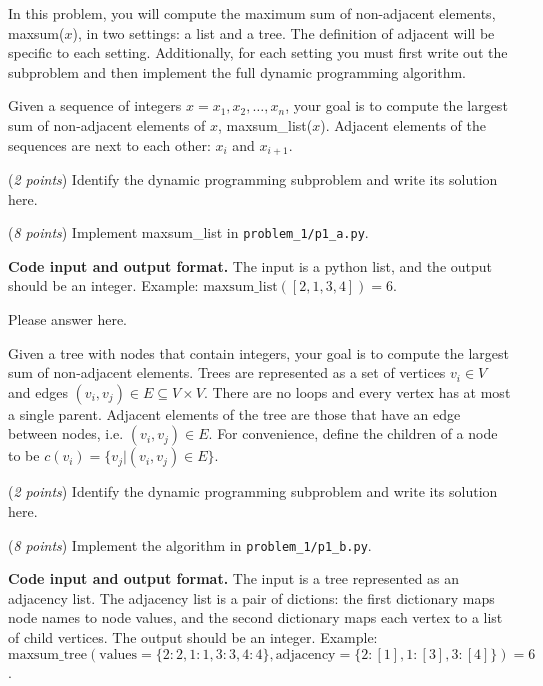 \documentclass{hw}
\newcommand{\io}{\textbf{Code input and output format.} }
\begin{document}

\begin{problem}
In this problem, you will compute the maximum sum of non-adjacent elements,
maxsum($x$), in two settings:
a list and a tree.
The definition of adjacent will be specific to each setting.
Additionally, for each setting you must first write out the subproblem
and then implement the full dynamic programming algorithm.

\begin{subproblem}
Given a sequence of integers $ x = x_1,x_2,\ldots,x_n $,
your goal is to compute the largest sum of non-adjacent elements of $x$,
maxsum\_list($x$).
Adjacent elements of the sequences are next to each other: $x_i$ and $x_{i+1}$.

(\textit{2 points}) Identify the dynamic programming subproblem and write its solution here.

(\textit{8 points}) Implement maxsum\_list in \texttt{problem\_1/p1\_a.py}.
\end{subproblem}

\io The input is a python list, and the output should be an integer.
Example: $\text{maxsum\_list}([2,1,3,4]) = 6$.

\begin{solution}
Please answer here.
\end{solution}

\begin{subproblem}
Given a tree with nodes that contain integers,
your goal is to compute the largest sum of non-adjacent elements.
Trees are represented as a set of vertices
$v_i \in V$ and edges $(v_i, v_j) \in E \subseteq V\times V$.
There are no loops and every vertex has at most a single parent.
Adjacent elements of the tree are those that have an edge between nodes, i.e. $(v_i,v_j)\in E$.
For convenience, define the children of a node to be $c(v_i) = \{v_j | (v_i,v_j)\in E\}$.

(\textit{2 points}) Identify the dynamic programming subproblem and write its solution here.

(\textit{8 points}) Implement the algorithm in \texttt{problem\_1/p1\_b.py}.
\end{subproblem}

\io The input is a tree represented as an adjacency list.
The adjacency list is a pair of dictions:
the first dictionary maps node names to node values,
and the second dictionary maps each vertex to a list of
child vertices.
The output should be an integer.
Example: $\text{maxsum\_tree}(\text{values} = \{2: 2, 1:1, 3:3, 4:4\}, \text{adjacency}=\{2: [1], 1: [3], 3: [4]\}) = 6$.


\end{problem}
\end{document}
